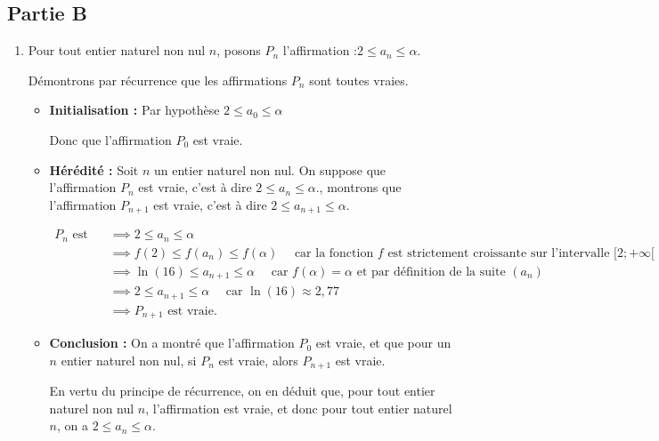 \documentclass[10pt]{article}
\begin{document}
\subsection*{Partie B}


\begin{enumerate}
	\item 	Pour tout entier naturel non  nul $n$, posons $P_n$ l'affirmation :\quad \og $2 \leqslant a_{n} \leqslant \alpha$\fg{}.

	Démontrons par récurrence que les affirmations $P_n$ sont toutes vraies.

	\begin{itemize}[label={\textbullet~}]
		\item \textbf{Initialisation :}  Par hypothèse  $2 \leqslant a_{0} \leqslant \alpha$

		Donc que l'affirmation $P_0$ est vraie.

		\item \textbf{Hérédité :} Soit $n$ un entier naturel non nul. On suppose que l'affirmation $P_n$ est vraie, c'est à dire $2 \leqslant a_{n} \leqslant \alpha$\fg{}., montrons que l'affirmation $P_{n+1}$ est vraie, c'est à dire $2 \leqslant a_{n+1} \leqslant \alpha$\fg{}.

		$\begin{aligned}
			P_n \text{ est vraie}
			&\implies 2 \leqslant a_{n} \leqslant \alpha\\
			&\implies f(2) \leqslant f\left(a_n\right)\leqslant f(\alpha)\quad \text{ car la fonction }f \text{ est strictement croissante sur l'intervalle }[2;+\infty[\\
			&\implies   \ln(16) \leqslant a_{n+1} \leqslant \alpha  \quad \text{ car } f(\alpha)=\alpha \text{ et par définition de la suite } \left(a_n\right)  \\
			&\implies 2 \leqslant a_{n+1} \leqslant \alpha \quad \text{ car } \ln(16)\approx 2,77\\
			&\implies P_{n+1}\text{ est vraie.}
		\end{aligned}$
		\item \textbf{Conclusion :} On a montré que l'affirmation $P_0$ est vraie, et que pour un $n$ entier naturel non nul, si $P_n$ est vraie, alors $P_{n+1}$ est vraie.

		En vertu du principe de récurrence, on en déduit que, pour tout entier naturel non nul $n$, l'affirmation est vraie, et donc pour tout entier naturel $n$, on a $2 \leqslant a_{n} \leqslant \alpha$.

	\end{itemize}





\end{enumerate}
\end{document}
